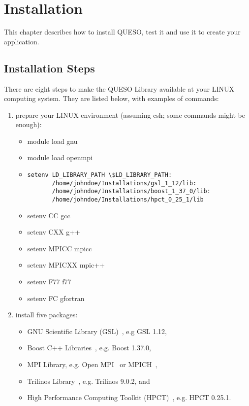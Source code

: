 \chapter{Installation}\label{ch-install}
\thispagestyle{headings}

This chapter describes how to install QUESO, test it and use it to create your application.

\section{Installation Steps}

There are eight steps to make the QUESO Library available at your LINUX computing system.
They are listed below, with examples of commands:
%
\begin{enumerate}
\item {prepare your LINUX environment (assuming csh; some commands might be enough): %
\begin{itemize}
\item module load gnu
\item module load openmpi
\item {
\begin{verbatim}
setenv LD_LIBRARY_PATH \$LD_LIBRARY_PATH:
       /home/johndoe/Installations/gsl_1_12/lib:
       /home/johndoe/Installations/boost_1_37_0/lib:
       /home/johndoe/Installations/hpct_0_25_1/lib
\end{verbatim}
}
\item setenv CC gcc
\item setenv CXX g++
\item setenv MPICC mpicc
\item setenv MPICXX mpic++
\item setenv F77 f77
\item setenv FC gfortran
\end{itemize}
}
\item {install five packages: %
\begin{itemize}
\item GNU Scientific Library (GSL)~\cite{Gsl}, e.g GSL 1.12,
\item Boost C++ Libraries~\cite{Boost}, e.g. Boost 1.37.0,
\item MPI Library, e.g. Open MPI~\cite{Openmpi} or MPICH~\cite{Mpich},
\item Trilinos Library~\cite{Trilinos}, e.g. Trilinos 9.0.2, and
\item {High Performance Computing Toolkit (HPCT)~\cite{Hpct}, e.g. HPCT 0.25.1.
}
\end{itemize}}
\end{enumerate}
